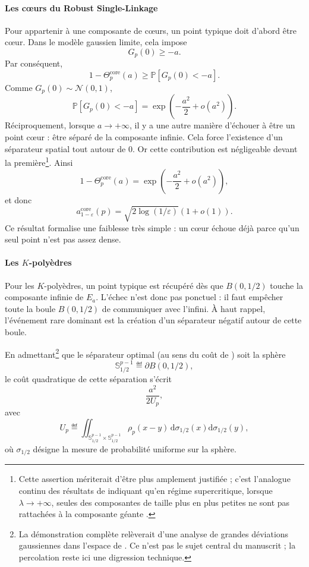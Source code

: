 \paragraph{Les cœurs du Robust Single-Linkage}
Pour appartenir à une composante de cœurs, un point typique doit d'abord être cœur. Dans le modèle gaussien limite, cela impose
\[
    G_p(0)\ge -a.
\]
Par conséquent,
\[
    1-\Theta_p^{\mathrm{core}}(a)
    \ge
    \mathbb P[G_p(0)<-a].
\]
Comme $G_p(0)\sim\mathcal N(0,1)$,
\[
    \mathbb P[G_p(0)<-a]
    =
    \exp\left(-\frac{a^2}{2}+o(a^2)\right).
\]
Réciproquement, lorsque $a\to+\infty$, il y a une autre manière d'échouer à être un point cœur : être séparé de la composante infinie. Cela force l'existence d'un séparateur spatial tout autour de $0$. Or cette contribution est négligeable devant la première\footnote{Cette assertion mériterait d'être plus amplement justifiée ; c'est l'analogue continu des résultats de  indiquant qu'en régime supercritique, lorsque $\lambda \to +\infty$, seules des composantes de taille plus en plus petites ne sont pas rattachées à la composante géante \cite{penrose2003, Penrose2025, PenroseKclusters}.}. Ainsi
\[
    1-\Theta_p^{\mathrm{core}}(a)
    =
    \exp\left(-\frac{a^2}{2}+o(a^2)\right),
\]
et donc
\[
    a_{1-\varepsilon}^{\mathrm{core}}(p)
    =
    \sqrt{2\log(1/\varepsilon)}(1+o(1)).
\]
Ce résultat formalise une faiblesse très simple : un cœur échoue déjà parce qu'un seul point n'est pas assez dense.

\paragraph{Les $K$-polyèdres}
Pour les $K$-polyèdres, un point typique est récupéré dès que $B(0,1/2)$ touche la composante infinie de $E_a$. L'échec n'est donc pas ponctuel : il faut empêcher toute la boule $B(0,1/2)$ de communiquer avec l'infini. À haut rappel, l'événement rare dominant est la création d'un séparateur négatif autour de cette boule.

En admettant\footnote{La démonstration complète relèverait d'une analyse de grandes déviations gaussiennes dans l'espace de . Ce n'est pas le sujet central du manuscrit ; la percolation reste ici une digression technique.} que le séparateur optimal (au sens du coût de  \cite{LedouxTalagrand1991, Lifshits2012, DemboZeitouni1998}) soit la sphère
\[
    \mathbb S^{p-1}_{1/2}\eqdef \partial B(0,1/2),
\]
le coût quadratique de cette séparation s'écrit
\[
    \frac{a^2}{2U_p},
\]
avec
\[
    U_p
    \eqdef
    \iint_{\mathbb S^{p-1}_{1/2}\times\mathbb S^{p-1}_{1/2}}
    \rho_p(x-y)\,
    \mathrm d\sigma_{1/2}(x) \mathrm d\sigma_{1/2}(y),
\]
où $\sigma_{1/2}$ désigne la mesure de probabilité uniforme sur la sphère.

